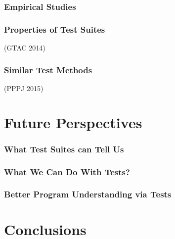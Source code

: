 \documentclass{beamer}
\begin{document}
\begin{frame}
  \frametitle{Empirical Studies}
\end{frame}

\begin{frame}
  \frametitle{Properties of Test Suites}
  (GTAC 2014)
\end{frame}

\begin{frame}
  \frametitle{Similar Test Methods}
  (PPPJ 2015)
\end{frame}

\section{Future Perspectives}

\begin{frame}
  \frametitle{What Test Suites can Tell Us}
\end{frame}

\begin{frame}
  \frametitle{What We Can Do With Tests?}
\end{frame}

\begin{frame}
  \frametitle{Better Program Understanding via Tests}
\end{frame}

\section{Conclusions}
\end{document}
